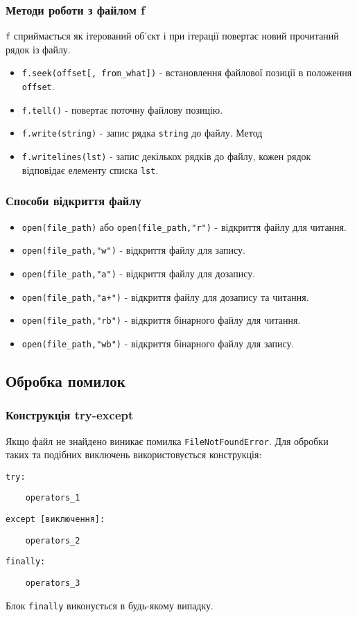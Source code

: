 \begin{frame}
\frametitle{Методи роботи з файлом f}

\texttt{f} сприймається як ітерований об'єкт і при ітерації повертає новий прочитаний рядок із файлу.

\begin{itemize}
  \item<1->  \texttt{f.seek(offset[, from\_what])} - встановлення файлової позиції в положення \texttt{offset}.
  \item<1-> \texttt{f.tell()} - повертає поточну файлову позицію.
  \item<2-> \texttt{f.write(string)} - запис рядка \texttt{string} до файлу. Метод      
  \item<2-> \texttt{f.writelines(lst)} - запис декількох рядків до файлу, кожен рядок відповідає елементу списка \texttt{lst}.
\end{itemize}

\end{frame}

\begin{frame}
\frametitle{Способи відкриття файлу}
\begin{itemize}
  \item<1-> \texttt{open(file\_path)} або \texttt{open(file\_path,"r")} - відкриття файлу для читання.
  \item<2-> \texttt{open(file\_path,"w")} - відкриття файлу для запису.
  \item<3-> \texttt{open(file\_path,"a")} - відкриття файлу для дозапису.
  \item<4-> \texttt{open(file\_path,"a+")} - відкриття файлу для дозапису та читання.
  \item<5-> \texttt{open(file\_path,"rb")} - відкриття бінарного файлу для читання.
  \item<5-> \texttt{open(file\_path,"wb")} - відкриття бінарного файлу для запису.
\end{itemize}

\end{frame}

\subsection{Обробка помилок}

\begin{frame}
\frametitle{Конструкція try-except}
Якщо файл не знайдено виникає помилка \texttt{FileNotFoundError}. Для обробки таких та подібних виключень використовується конструкція:

\texttt{try:}

\texttt{~~~~operators\_1}

\texttt{except [виключення]:}

\texttt{~~~~operators\_2}

\texttt{finally:}

\texttt{~~~~operators\_3}

Блок \texttt{finally} виконується в будь-якому випадку.

\end{frame}

